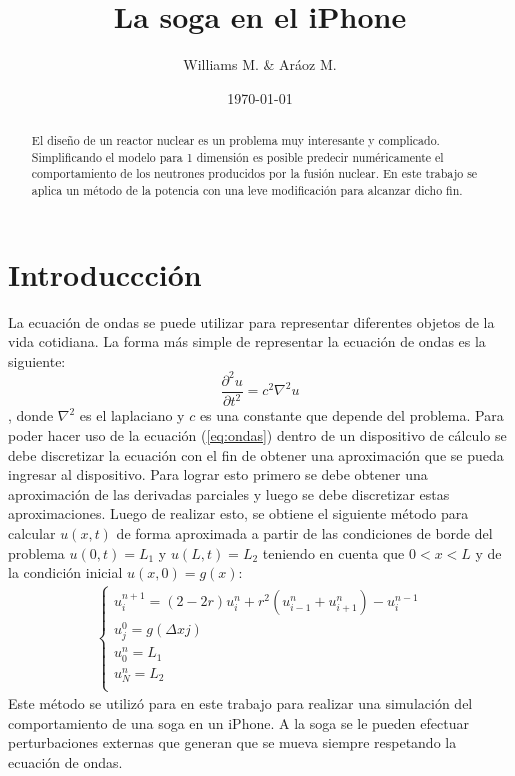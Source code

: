 \documentclass[11pt,a4paper]{emulateapj}
\begin{document}
\title{La soga en el iPhone}
\author{Williams M. \& Aráoz M.}
\date{\today}


\begin{abstract}
El diseño de un reactor nuclear es un problema muy interesante y complicado. Simplificando el
modelo para 1 dimensión es posible predecir numéricamente el comportamiento de los neutrones
producidos por la fusión nuclear. En este trabajo se aplica un método de la potencia con una 
leve modificación para alcanzar dicho fin.
\end{abstract}

\maketitle




\section{Introduccción}
\label{sec:introduccion}
La ecuación de ondas se puede utilizar para representar diferentes objetos de la vida cotidiana. La forma más simple de representar la ecuación de ondas es la siguiente:
\begin{equation}
\label{eq:ondas}
\frac{\partial ^2 u}{\partial t^2} = c^2 \nabla ^2 u
\end{equation}
, donde $\nabla ^2$ es el laplaciano y $c$ es una constante que depende del problema. Para poder hacer uso de la ecuación (\ref{eq:ondas}) dentro de un dispositivo de cálculo se debe discretizar la ecuación con el fin de obtener una aproximación que se pueda ingresar al dispositivo. Para lograr esto primero se debe obtener una aproximación de las derivadas parciales y luego se debe discretizar estas aproximaciones. Luego de realizar esto, se obtiene el siguiente método para calcular $u(x,t)$ de forma aproximada a partir de las condiciones de borde del problema $u(0,t) = L_1$ y $u(L,t) = L_2$ teniendo en cuenta que $0 < x < L$ y de la condición inicial $u(x,0) = g(x)$:
\begin{eqnarray}
	\label{eq:metodoDeOndas}
	\left\{
		\begin{matrix}
			u_i^{n+1} = (2-2r) u_i^n + r^2 (u_{i-1}^n+u_{i+1}^n) - u_i^{n-1}\\
			u_j^0 = g(\Delta x j)\\
			u_0^n = L_1\\ 
			u_N^n = L_2\\
		\end{matrix} \right.
\end{eqnarray}
Este método se utilizó para en este trabajo para realizar una simulación del comportamiento de una soga en un iPhone. A la soga se le pueden efectuar perturbaciones externas que generan que se mueva siempre respetando la ecuación de ondas.
\end{document}
